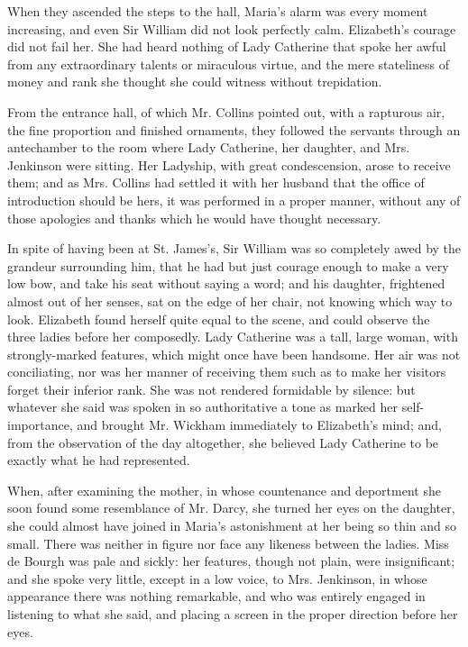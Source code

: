 \documentclass[12pt,openright]{book}
\begin{document}
When they ascended the steps to the hall, Maria’s alarm was every moment increasing, and even Sir William did not look perfectly calm. Elizabeth’s courage did not fail her. She had heard nothing of Lady Catherine that spoke her awful from any extraordinary talents or miraculous virtue, and the mere stateliness of money and rank she thought she could witness without trepidation.

From the entrance hall, of which Mr. Collins pointed out, with a rapturous air, the fine proportion and finished ornaments, they followed the servants through an antechamber to the room where Lady Catherine, her daughter, and Mrs. Jenkinson were sitting. Her Ladyship, with great condescension, arose to receive them; and as Mrs. Collins had settled it with her husband that the office of introduction should be hers, it was performed in a proper manner, without any of those apologies and thanks which he would have thought necessary.

In spite of having been at St. James’s, Sir William was so completely awed by the grandeur surrounding him, that he had but just courage enough to make a very low bow, and take his seat without saying a word; and his daughter, frightened almost out of her senses, sat on the edge of her chair, not knowing which way to look. Elizabeth found herself quite equal to the scene, and could observe the three ladies before her composedly. Lady Catherine was a tall, large woman, with strongly-marked features, which might once have been handsome. Her air was not conciliating, nor was her manner of receiving them such as to make her visitors forget their inferior rank. She was not rendered formidable by silence: but whatever she said was spoken in so authoritative a tone as marked her self-importance, and brought Mr. Wickham immediately to Elizabeth’s mind; and, from the observation of the day altogether, she believed Lady Catherine to be exactly what he had represented.

When, after examining the mother, in whose countenance and deportment she soon found some resemblance of Mr. Darcy, she turned her eyes on the daughter, she could almost have joined in Maria’s astonishment at her being so thin and so small. There was neither in figure nor face any likeness between the ladies. Miss de Bourgh was pale and sickly: her features, though not plain, were insignificant; and she spoke very little, except in a low voice, to Mrs. Jenkinson, in whose appearance there was nothing remarkable, and who was entirely engaged in listening to what she said, and placing a screen in the proper direction before her eyes.
\end{document}
